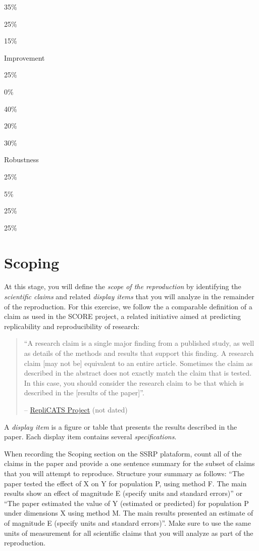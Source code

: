 \documentclass[
]{book}
\begin{document}
35\%

25\%

15\%

Improvement

25\%

0\%

40\%

20\%

30\%

Robustness

25\%

5\%

25\%

25\%

\hypertarget{scoping}{%
\chapter{Scoping}\label{scoping}}

At this stage, you will define the \emph{scope of the reproduction} by identifying the \emph{scientific claims} and related \emph{display items} that you will analyze in the remainder of the reproduction. For this exercise, we follow the a comparable definition of a claim as used in the SCORE project, a related initiative aimed at predicting replicability and reproducibility of research:

\begin{quote}
``A research claim is a single major finding from a published study, as well as details of the methods and results that support this finding. A research claim {[}may not be{]} equivalent to an entire article. Sometimes the claim as described in the abstract does not exactly match the claim that is tested. In this case, you should consider the research claim to be that which is described in the {[}results of the paper{]}''.

-- \href{https://replicats.research.unimelb.edu.au/\#tab301}{RepliCATS Project} (not dated)
\end{quote}

A \emph{display item} is a figure or table that presents the results described in the paper. Each display item contains several \emph{specifications}.

When recording the Scoping section on the SSRP plataform, count all of the claims in the paper and provide a one sentence summary for the subset of claims that you will attempt to reproduce. Structure your summary as follows: ``The paper tested the effect of X on Y for population P, using method F. The main results show an effect of magnitude E (specify units and standard errors)'' or ``The paper estimated the value of Y (estimated or predicted) for population P under dimensions X using method M. The main results presented an estimate of of magnitude E (specify units and standard errors)''. Make sure to use the same units of measurement for all scientific claims that you will analyze as part of the reproduction.
\end{document}
